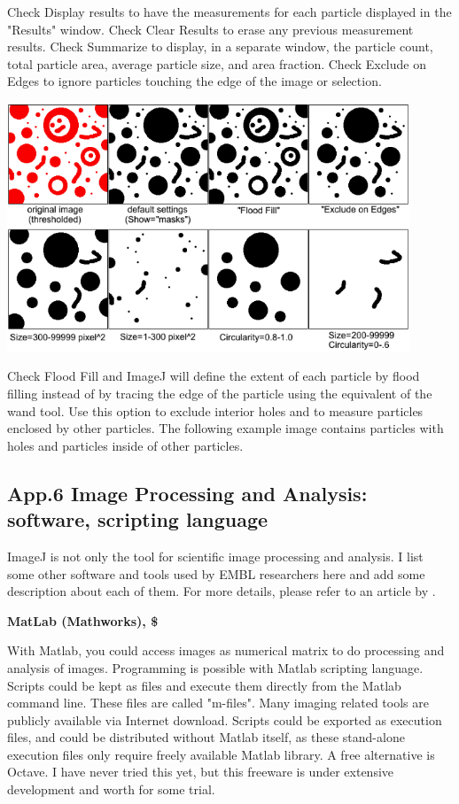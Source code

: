 Check Display results to have the measurements for each particle
displayed in the "Results" window. Check
Clear Results to erase any previous measurement results. Check
Summarize to display, in a separate window, the particle count, total
particle area, average particle size, and area fraction. Check Exclude
on Edges to ignore particles touching the edge of the image or
selection.

\includegraphics[width=12cm]{img/CMCIBasicCourse201102-img170.png}

Check Flood Fill and ImageJ will define the extent of each particle by
flood filling instead of by tracing the edge of the particle using the
equivalent of the wand tool. Use this option to exclude interior holes
and to measure particles enclosed by other particles. The following
example image contains particles with holes and particles inside of
other particles.


\clearpage

\subsection{App.6 Image Processing and Analysis: software, scripting language}
\label{app6}

ImageJ is not only the tool for scientific image processing and
analysis. I list some other software and tools used by EMBL researchers
here and add some description about each of them. For more details, please refer to an article by \citet{WalterNATM2010}.

\textbf{MatLab (Mathworks), \$}

With Matlab, you could access images as numerical matrix to do
processing and analysis of images. Programming is possible with Matlab
scripting language. Scripts could be kept as files and execute them
directly from the Matlab command line. These files are called
"m-files". Many imaging related
tools are publicly available via Internet download. Scripts could be
exported as execution files, and could be distributed without Matlab
itself, as these stand-alone execution files only require freely
available Matlab library. A free alternative is Octave. I have never
tried this yet, but this freeware is under extensive development and
worth for some trial. 



